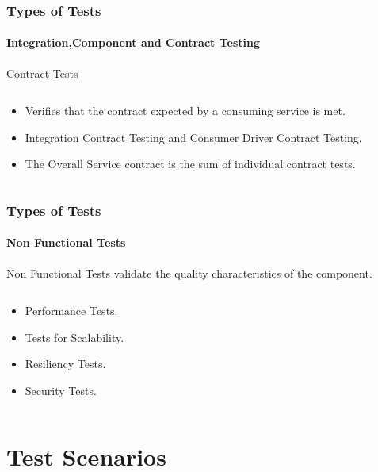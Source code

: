 \documentclass{beamer}
\begin{document}
\begin{frame}
	\frametitle{Types of Tests}	
	\framesubtitle{Integration,Component and Contract Testing}
Contract Tests
\begin{columns}
 \begin{column}{.9\textwidth}
	\begin{itemize}
		\item Verifies that the contract expected by a consuming service is met.
		\item Integration Contract Testing and Consumer Driver Contract Testing.
\item The Overall Service contract is the sum of individual contract tests.
		
	\end{itemize}
\end{column}

\end{columns}
\end{frame}


\begin{frame}
\frametitle{Types of Tests}	
	\framesubtitle{Non Functional Tests}
Non Functional Tests validate the quality characteristics of the component.
\begin{columns}
 \begin{column}{.9\textwidth}
	\begin{itemize}
		\item Performance Tests.
		\item Tests for Scalability.
		\item Resiliency Tests.
		\item Security Tests.

		
	\end{itemize}
\end{column}

\end{columns}
\end{frame}


\section{Test Scenarios}
\end{document}
